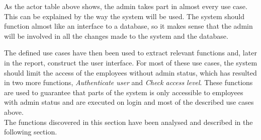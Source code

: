 As the actor table above shows, the admin takes part in almost every use case. This can be explained by the way the system will be used. The system should function almost like an interface to a database, so it makes sense that the admin will be involved in all the changes made to the system and the database.
\par

The defined use cases have then been used to extract relevant functions and, later in the report, construct the user interface. For most of these use cases, the system should limit the access of the employees without admin status, which has resulted in two more functions, \textit{Authenticate user} and \textit{Check access level}. These functions are used to guarantee that parts of the system is only accessible to employees with admin status and are executed on login and most of the described use cases above.\\

The functions discovered in this section have been analysed and described in the following section.